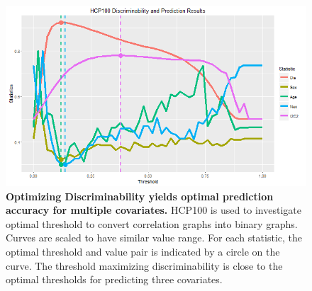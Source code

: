 \documentclass{article}
\begin{document}
\begin{figure}[ht!]
\includegraphics[width=\linewidth]{../Figs/HCP_100.png}
\caption{{\bf Optimizing Discriminability yields optimal prediction accuracy for multiple covariates.} HCP100 is used to investigate optimal threshold to convert correlation graphs into binary graphs. Curves are scaled to have similar value range. For each statistic, the optimal threshold and value pair is indicated by a circle on the curve. The threshold maximizing discriminability is close to the optimal thresholds for predicting three covariates. }
\label{fig:4}
\end{figure}
\end{document}
